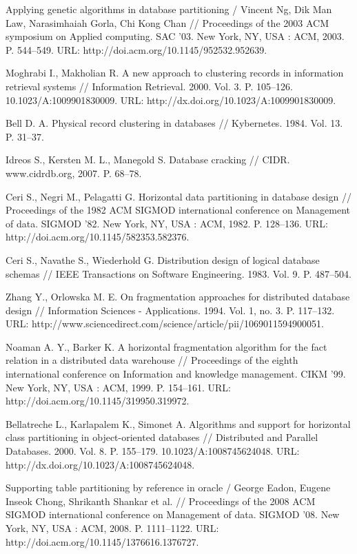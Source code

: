 \documentclass[unicode]{beamer}
\begin{document}
\begin{frame}[allowframebreaks]
{\begin{thebibliography}{99}
 Applying genetic algorithms in database partitioning / Vincent Ng, Dik Man Law, Narasimhaiah Gorla, Chi Kong Chan // Proceedings of the 2003 ACM symposium on Applied computing. SAC ’03. New York, NY, USA : ACM, 2003. P. 544--549. URL: http://doi.acm.org/10.1145/952532.952639.

 Moghrabi I., Makholian R. A new approach to clustering records in information retrieval systems // Information Retrieval. 2000. Vol. 3. P. 105--126. 10.1023/A:1009901830009. URL: http://dx.doi.org/10.1023/A:1009901830009.

 Bell D. A. Physical record clustering in databases // Kybernetes. 1984. Vol. 13. P. 31--37.

 Idreos S., Kersten M. L., Manegold S. Database cracking // CIDR. www.cidrdb.org, 2007. P. 68--78.

 Ceri S., Negri M., Pelagatti G. Horizontal data partitioning in database design // Proceedings of the 1982 ACM SIGMOD international conference on Management of data. SIGMOD ’82. New York, NY, USA : ACM, 1982. P. 128--136. URL: http://doi.acm.org/10.1145/582353.582376.

 Ceri S., Navathe S., Wiederhold G. Distribution design of logical database schemas // IEEE Transactions on Software Engineering. 1983. Vol. 9. P. 487--504.

 Zhang Y., Orlowska M. E. On fragmentation approaches for distributed database design // Information Sciences - Applications. 1994. Vol. 1, no. 3. P. 117--132. URL: http://www.sciencedirect.com/science/article/pii/1069011594900051.

 Noaman A. Y., Barker K. A horizontal fragmentation algorithm for the fact relation in a distributed data warehouse // Proceedings of the eighth international conference on Information and knowledge management. CIKM ’99. New York, NY, USA : ACM, 1999. P. 154--161. URL: http://doi.acm.org/10.1145/319950.319972.

 Bellatreche L., Karlapalem K., Simonet A. Algorithms and support for horizontal class partitioning in object-oriented databases // Distributed and Parallel Databases. 2000. Vol. 8. P. 155--179. 10.1023/A:1008745624048. URL: http://dx.doi.org/10.1023/A:1008745624048.

 Supporting table partitioning by reference in oracle / George Eadon, Eugene Inseok Chong, Shrikanth Shankar et al. // Proceedings of the 2008 ACM SIGMOD international conference on Management of data. SIGMOD ’08. New York, NY, USA : ACM, 2008. P. 1111--1122. URL: http://doi.acm.org/10.1145/1376616.1376727.


\end{thebibliography}}
\end{frame}
\end{document}
